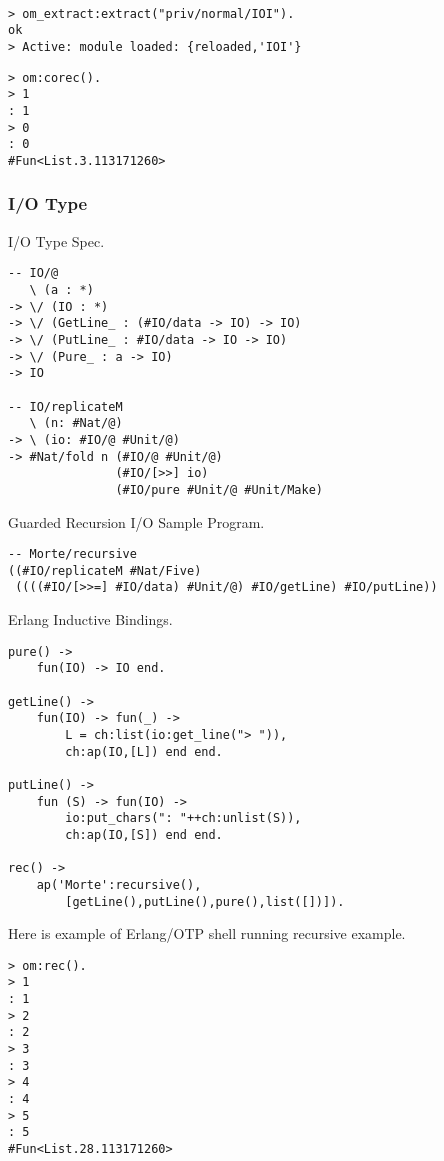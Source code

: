 \documentclass{article}
\begin{document}
\begin{lstlisting}[mathescape=true]

> om_extract:extract("priv/normal/IOI").
ok
> Active: module loaded: {reloaded,'IOI'}
\end{lstlisting}

\begin{lstlisting}[mathescape=true]
> om:corec().
> 1
: 1
> 0
: 0
#Fun<List.3.113171260>
\end{lstlisting}

\subsubsection{I/O Type}

I/O Type Spec.

\begin{lstlisting}[mathescape=true]
-- IO/@
   \ (a : *)
-> \/ (IO : *)
-> \/ (GetLine_ : (#IO/data -> IO) -> IO)
-> \/ (PutLine_ : #IO/data -> IO -> IO)
-> \/ (Pure_ : a -> IO)
-> IO

-- IO/replicateM
   \ (n: #Nat/@)
-> \ (io: #IO/@ #Unit/@)
-> #Nat/fold n (#IO/@ #Unit/@)
               (#IO/[>>] io)
               (#IO/pure #Unit/@ #Unit/Make)
\end{lstlisting}

Guarded Recursion I/O Sample Program.

\begin{lstlisting}[mathescape=true]
-- Morte/recursive
((#IO/replicateM #Nat/Five)
 ((((#IO/[>>=] #IO/data) #Unit/@) #IO/getLine) #IO/putLine))
\end{lstlisting}

Erlang Inductive Bindings.

\begin{lstlisting}[mathescape=true]
pure() ->
    fun(IO) -> IO end.

getLine() ->
    fun(IO) -> fun(_) ->
        L = ch:list(io:get_line("> ")),
        ch:ap(IO,[L]) end end.

putLine() ->
    fun (S) -> fun(IO) ->
        io:put_chars(": "++ch:unlist(S)),
        ch:ap(IO,[S]) end end.

rec() ->
    ap('Morte':recursive(),
        [getLine(),putLine(),pure(),list([])]).
\end{lstlisting}


Here is example of Erlang/OTP shell running recursive example.

\begin{lstlisting}[mathescape=true]
> om:rec().
> 1
: 1
> 2
: 2
> 3
: 3
> 4
: 4
> 5
: 5
#Fun<List.28.113171260>
\end{lstlisting}
\end{document}

